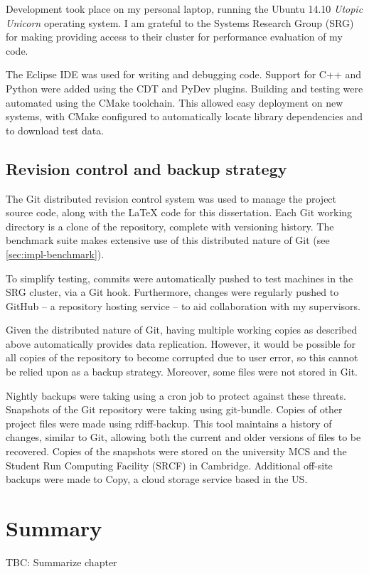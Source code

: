 Development took place on my personal laptop, running the Ubuntu 14.10 \textit{Utopic Unicorn} operating system. I am grateful to the Systems Research Group (SRG) for making providing access to their cluster for performance evaluation of my code.

The Eclipse IDE was used for writing and debugging code. Support for C++ and Python were added using the CDT and PyDev plugins. Building and testing were automated using the CMake toolchain. This allowed easy deployment on new systems, with CMake configured to automatically locate library dependencies and to download test data.

\subsection{Revision control and backup strategy}



The Git distributed revision control system was used to manage the project source code, along with the {\LaTeX} code for this dissertation. Each Git working directory is a clone of the repository, complete with versioning history. The benchmark suite makes extensive use of this distributed nature of Git (see \cref{sec:impl-benchmark}).


To simplify testing, commits were automatically pushed to test machines in the SRG cluster, via a Git hook. Furthermore, changes were regularly pushed to GitHub -- a repository hosting service -- to aid collaboration with my supervisors. 

Given the distributed nature of Git, having multiple working copies as described above automatically provides data replication. However, it would be possible for all copies of the repository to become corrupted due to user error, so this cannot be relied upon as a backup strategy. Moreover, some files were not stored in Git\footnotemark.

Nightly backups were taking using a cron job to protect against these threats. Snapshots of the Git repository were taking using git-bundle. Copies of other project files were made using rdiff-backup. This tool maintains a history of changes, similar to Git, allowing both the current and older versions of files to be recovered. Copies of the snapshots were stored on the university MCS and the Student Run Computing Facility (SRCF) in Cambridge. Additional off-site backups were made to Copy, a cloud storage service based in the US.


%

\section{Summary}

TBC: Summarize chapter